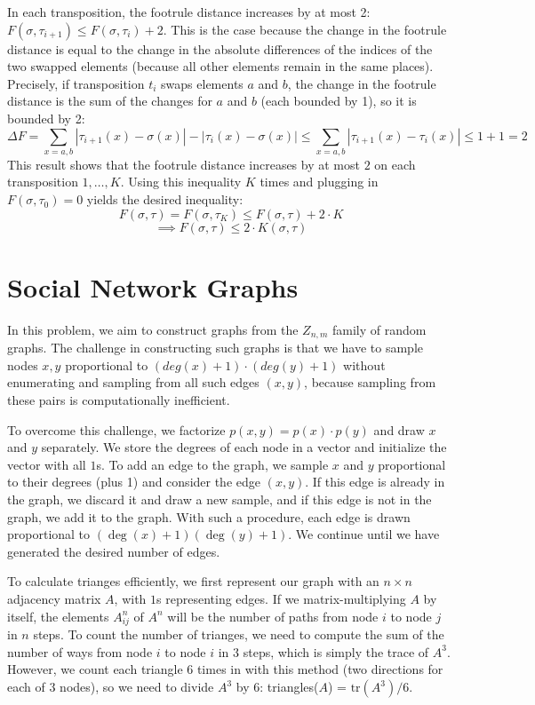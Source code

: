 \documentclass[11pt,letterpaper]{article}
\begin{document}
In each transposition, the footrule distance increases by at most 2: $F(\sigma, \tau_{i+1}) \leq F(\sigma, \tau_{i}) + 2$. This is the case because the change in the footrule distance is equal to the change in the absolute differences of the indices of the two swapped elements (because all other elements remain in the same places). Precisely, if transposition $t_i$ swaps elements $a$ and $b$, the change in the footrule distance is the sum of the changes for $a$ and $b$ (each bounded by 1), so it is bounded by 2:
\[ \Delta F = \sum_{x=a,b} |\tau_{i+1}(x) - \sigma(x)| - |\tau_{i}(x) - \sigma(x)| \leq \sum_{x=a,b} |\tau_{i+1}(x) - \tau_{i}(x)| \leq 1 + 1 = 2 \]
This result shows that the footrule distance increases by at most $2$ on each transposition $1,\ldots,K$. Using this inequality $K$ times and plugging in $F(\sigma, \tau_0) = 0$ yields the desired inequality:
\[ F(\sigma, \tau) = F(\sigma, \tau_K) \leq F(\sigma, \tau) + 2 \cdot K\]
\[ \implies F(\sigma, \tau) \leq 2 \cdot K(\sigma, \tau) \]

\section{Social Network Graphs}

In this problem, we aim to construct graphs from the $Z_{n,m}$ family of random graphs. The challenge in constructing such graphs is that we have to sample nodes $x,y$ proportional to $(deg(x)+1)\cdot(deg(y)+1)$ without enumerating and sampling from all such edges $(x,y)$, because sampling from these pairs is computationally inefficient.

To overcome this challenge, we factorize $p(x,y) = p(x) \cdot p(y)$ and draw $x$ and $y$ separately. We store the degrees of each node in a vector and initialize the vector with all $1$s. To add an edge to the graph, we sample $x$ and $y$ proportional to their degrees (plus 1) and consider the edge $(x,y)$. If this edge is already in the graph, we discard it and draw a new sample, and if this edge is not in the graph, we add it to the graph. With such a procedure, each edge is drawn proportional to $(\deg(x) + 1)(\deg(y) + 1)$. We continue until we have generated the desired number of edges.

To calculate trianges efficiently, we first represent our graph with an $n \times n$ adjacency matrix $A$, with $1$s representing edges. If we matrix-multiplying $A$ by itself, the elements $A_{ij}^n$ of $A^n$ will be the number of paths from node $i$ to node $j$ in $n$ steps. To count the number of trianges, we need to compute the sum of the number of ways from node $i$ to node $i$ in $3$ steps, which is simply the trace of $A^3$. However, we count each triangle $6$ times in with this method (two directions for each of $3$ nodes), so we need to divide $A^3$ by $6$: triangles($A$) =  $\text{tr}(A^3) / 6$.
\end{document}
